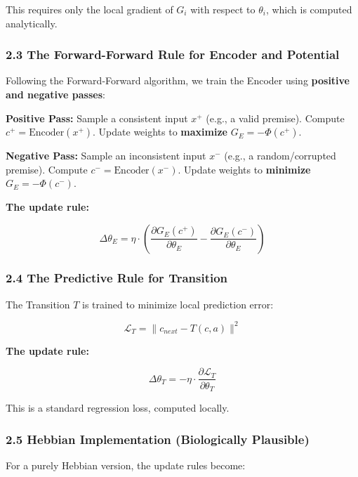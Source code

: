 \documentclass[
  11pt,
  a4paper,
]{article}
\begin{document}
This requires only the local gradient of \(G_i\) with respect to
\(\theta_i\), which is computed analytically.

\subsubsection{2.3 The Forward-Forward Rule for Encoder and
Potential}\label{the-forward-forward-rule-for-encoder-and-potential}

Following the Forward-Forward algorithm, we train the Encoder using
\textbf{positive and negative passes}:

\textbf{Positive Pass:} Sample a consistent input \(x^+\) (e.g., a valid
premise). Compute \(c^+ = \text{Encoder}(x^+)\). Update weights to
\textbf{maximize} \(G_E = -\Phi(c^+)\).

\textbf{Negative Pass:} Sample an inconsistent input \(x^-\) (e.g., a
random/corrupted premise). Compute \(c^- = \text{Encoder}(x^-)\). Update
weights to \textbf{minimize} \(G_E = -\Phi(c^-)\).

\textbf{The update rule:}

\[\Delta \theta_E = \eta \cdot \left( \frac{\partial G_E(c^+)}{\partial \theta_E} - \frac{\partial G_E(c^-)}{\partial \theta_E} \right)\]

\subsubsection{2.4 The Predictive Rule for
Transition}\label{the-predictive-rule-for-transition}

The Transition \(T\) is trained to minimize local prediction error:

\[\mathcal{L}_T = \|c_{next} - T(c, a)\|^2\]

\textbf{The update rule:}

\[\Delta \theta_T = -\eta \cdot \frac{\partial \mathcal{L}_T}{\partial \theta_T}\]

This is a standard regression loss, computed locally.

\subsubsection{2.5 Hebbian Implementation (Biologically
Plausible)}\label{hebbian-implementation-biologically-plausible}

For a purely Hebbian version, the update rules become:
\end{document}
